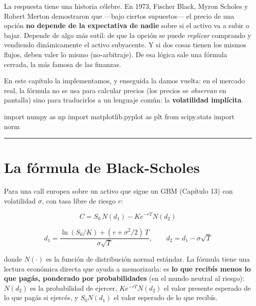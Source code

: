 \documentclass[
  spanish,
  letterpaper,
  DIV=11,
  numbers=noendperiod]{scrreprt}
\newenvironment{Shaded}{\begin{snugshade}}{\end{snugshade}}
\newcommand{\ImportTok}[1]{\textcolor[rgb]{0.00,0.46,0.62}{#1}}
\newcommand{\NormalTok}[1]{\textcolor[rgb]{0.00,0.23,0.31}{#1}}
\begin{document}
La respuesta tiene una historia célebre. En 1973, Fischer Black, Myron
Scholes y Robert Merton demostraron que ---bajo ciertos supuestos--- el
precio de una opción \textbf{no depende de la expectativa de nadie}
sobre si el activo va a subir o bajar. Depende de algo más sutil: de que
la opción se puede \emph{replicar} comprando y vendiendo dinámicamente
el activo subyacente. Y si dos cosas tienen los mismos flujos, deben
valer lo mismo (no-arbitraje). De esa lógica sale una fórmula cerrada,
la más famosa de las finanzas.

En este capítulo la implementamos, y enseguida la damos vuelta: en el
mercado real, la fórmula no se usa para calcular precios (los precios se
\emph{observan} en pantalla) sino para traducirlos a un lenguaje común:
la \textbf{volatilidad implícita}.

\label{setup}
\begin{Shaded}
\begin{Highlighting}[]
\ImportTok{import}\NormalTok{ numpy }\ImportTok{as}\NormalTok{ np}
\ImportTok{import}\NormalTok{ matplotlib.pyplot }\ImportTok{as}\NormalTok{ plt}
\ImportTok{from}\NormalTok{ scipy.stats }\ImportTok{import}\NormalTok{ norm}
\end{Highlighting}
\end{Shaded}

\begin{center}\rule{0.5\linewidth}{0.5pt}\end{center}

\chapter{La fórmula de
Black-Scholes}\label{la-fuxf3rmula-de-black-scholes}

Para una call europea sobre un activo que sigue un GBM (Capítulo 13) con
volatilidad \(\sigma\), con tasa libre de riesgo \(r\):

\[C = S_0\, N(d_1) - K e^{-rT} N(d_2)\]

\[d_1 = \frac{\ln(S_0/K) + (r + \sigma^2/2)\,T}{\sigma\sqrt{T}}, \qquad d_2 = d_1 - \sigma\sqrt{T}\]

donde \(N(\cdot)\) es la función de distribución normal estándar. La
fórmula tiene una lectura económica directa que ayuda a memorizarla: es
\textbf{lo que recibís menos lo que pagás, ponderado por probabilidades}
(en el mundo neutral al riesgo): \(N(d_2)\) es la probabilidad de
ejercer, \(K e^{-rT} N(d_2)\) el valor presente esperado de lo que pagás
si ejercés, y \(S_0 N(d_1)\) el valor esperado de lo que recibís.
\end{document}

